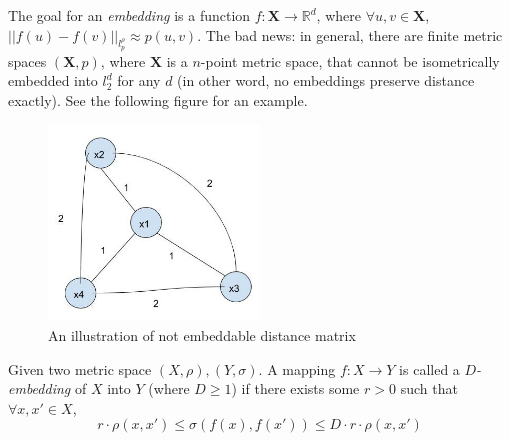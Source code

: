 The goal for an \emph{embedding} is a function
$f:\mathbf{X}\rightarrow \mathbb{R}^d$, where $\forall u,v \in
\mathbf{X}$, $||f(u)-f(v)||_{l_p^\rho} \approx p(u,v)$. 
The bad news: in general, there are finite metric spaces
$(\mathbf{X},p)$, where $\mathbf{X}$ is a $n$-point metric space, that
cannot be isometrically embedded into $l_2^d$ for any $d$ (in other
word, no embeddings preserve distance exactly). See the following
figure for an example. 
\begin{figure}[h!]
\begin{center}
\includegraphics[width=0.5\textwidth]{chapter_5/files/unembeddable.jpg}
\caption{An illustration of not embeddable distance matrix}
\end{center}
\end{figure}

\begin{definition}
Given two metric space $(X,\rho), (Y,\sigma)$. A mapping $f:
X\rightarrow Y$ is called a \emph{$D$-embedding} of $X$ into $Y$
(where $D\geq 1$) if there exists some $r>0$ such that $\forall x,x'
\in X$, 
\[
r \cdot \rho(x,x') \leq \sigma(f(x),f(x')) \leq D \cdot r \cdot
\rho(x,x') 
\]
\end{definition}
